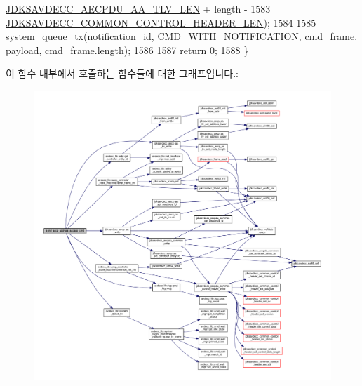 \begin{DoxyCode}
      \hyperlink{group___a_e_c_p___a_a__tlv_ga8c9adb511e50d7ed81e30527a0f86d5b}{JDKSAVDECC\_AECPDU\_AA\_TLV\_LEN} + length -
1583                                                            
      \hyperlink{group__jdksavdecc__avtp__common__control__header_gaae84052886fb1bb42f3bc5f85b741dff}{JDKSAVDECC\_COMMON\_CONTROL\_HEADER\_LEN});
1584 
1585     \hyperlink{namespaceavdecc__lib_a6dd511685627c0865a3442b539a4e8e9}{system\_queue\_tx}(notification\_id, \hyperlink{namespaceavdecc__lib_aabcadff06aa62be0ce47bc0646823604aba48b8a017e06fb240b650cdea965178}{CMD\_WITH\_NOTIFICATION}, cmd\_frame.
      payload, cmd\_frame.length);
1586 
1587     \textcolor{keywordflow}{return} 0;
1588 \}
\end{DoxyCode}


이 함수 내부에서 호출하는 함수들에 대한 그래프입니다.\+:
\nopagebreak
\begin{figure}[H]
\begin{center}
\leavevmode
\includegraphics[width=350pt]{classavdecc__lib_1_1end__station__imp_a56f03efde2e3ff66697a2eb6bf42b143_cgraph}
\end{center}
\end{figure}


